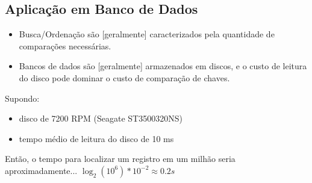 \subsection{Aplicação em Banco de Dados}
\begin{frame}[label=notas]
	\begin{itemize}
		\item Busca/Ordenação são [geralmente] caracterizados pela quantidade de 
		comparações necessárias.
		\item Bancos de dados são [geralmente] armazenados em discos, e o custo 
		de leitura do disco pode dominar o custo de comparação de chaves.
	\end{itemize}
	\vfill\pause
	Supondo:
	\begin{itemize}
		\item disco de 7200 RPM (Seagate ST3500320NS)
		\item tempo médio de leitura do disco de 10 ms
	\end{itemize}
	\vfill
	Então, o tempo para localizar um registro em um milhão seria aproximadamente...
	\pause $\log_2(10^6)*10^{-2}\approx0.2s$
\end{frame}

